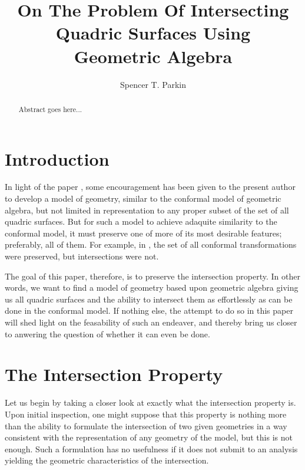 \documentclass{birkjour}
\theoremstyle{definition}
\theoremstyle{remark}
\numberwithin{equation}{section}
\begin{document}
\title{On The Problem Of Intersecting\\Quadric Surfaces Using\\Geometric Algebra}

\author{Spencer T. Parkin}
\address{102 W. 500 S., \\
Salt Lake City, UT  84101} 



\begin{abstract}
Abstract goes here...
\end{abstract}


\maketitle

\section{Introduction}

In light of the paper \cite{}, some encouragement has been given to the present
author to develop a model of geometry, similar to the conformal model of geometric
algebra, but not limited in representation to any proper subset of the set of all
quadric surfaces.  But for such a model to achieve adaquite similarity to the conformal model,
it must preserve one of more of its most desirable features; preferably, all of them.
For example, in \cite{}, the set of all conformal transformations were preserved, but
intersections were not.

The goal of this paper, therefore, is to
preserve the intersection property.  In other words, we want to find a model of geometry based upon
geometric algebra giving us all quadric surfaces and the ability to intersect them
as effortlessly as can be done in the conformal model.  If nothing else, the attempt
to do so in this paper will shed light on the feasability of such an endeaver, and thereby
bring us closer to anwering the question of whether it can even be done.

\section{The Intersection Property}

Let us begin by taking a closer look at exactly what the intersection property is.
Upon initial inspection, one might suppose that this property is nothing more than
the ability to formulate the intersection of two given geometries in a way consistent
with the representation of any geometry of the model, but this is not
enough.  Such a formulation has no usefulness if it does not submit to an
analysis yielding the geometric characteristics of the intersection.
\end{document}
